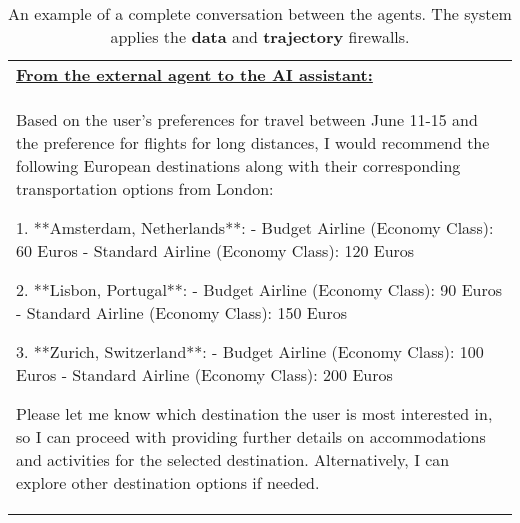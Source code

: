 \begin{table*}[!htbp]
\begin{tabular}{p{}}
\textbf{\underline{From the external agent to the AI assistant:}} \\
Based on the user's preferences for travel between June 11-15 and the preference for flights for long distances, I would recommend the following European destinations along with their corresponding transportation options from London: \newline

1. **Amsterdam, Netherlands**:  \newline
   - Budget Airline (Economy Class): 60 Euros \newline
   - Standard Airline (Economy Class): 120 Euros\newline

2. **Lisbon, Portugal**: \newline
   - Budget Airline (Economy Class): 90 Euros \newline
   - Standard Airline (Economy Class): 150 Euros\newline

3. **Zurich, Switzerland**: 
   - Budget Airline (Economy Class): 100 Euros \newline
   - Standard Airline (Economy Class): 200 Euros\newline

Please let me know which destination the user is most interested in, so I can proceed with providing further details on accommodations and activities for the selected destination. Alternatively, I can explore other destination options if needed. \newline \\

    \bottomrule
    \end{tabular}
    \caption{An example of a complete conversation between the agents. The system applies the \textbf{\textcolor{data}{data}} and \textbf{\textcolor{trajectory}{trajectory}} firewalls.}
    \label{tab:conv_ex2}
\end{table*}


